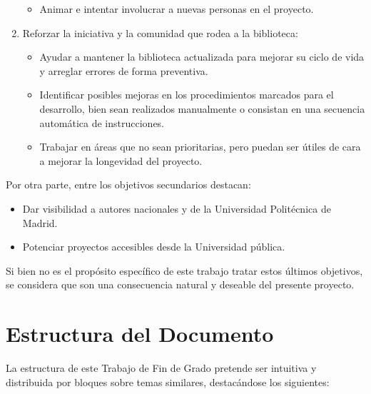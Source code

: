 \begin{enumerate}
\begin{itemize}
        \item Animar e intentar involucrar a nuevas personas en el proyecto.
    \end{itemize}

    \item Reforzar la iniciativa y la comunidad que rodea a la biblioteca:
    
    \begin{itemize}
        \item Ayudar a mantener la biblioteca actualizada para mejorar su ciclo de vida y arreglar errores de forma preventiva.
        
        \item Identificar posibles mejoras en los procedimientos marcados para el desarrollo, bien sean realizados manualmente o consistan en una secuencia automática de instrucciones.

        \item Trabajar en áreas que no sean prioritarias, pero puedan ser útiles de cara a mejorar la longevidad del proyecto.
    \end{itemize}

\end{enumerate}

Por otra parte, entre los objetivos secundarios destacan:

\begin{itemize}

    \item Dar visibilidad a autores nacionales y de la Universidad Politécnica de Madrid.

    \item Potenciar proyectos accesibles desde la Universidad pública.

\end{itemize}

Si bien no es el propósito específico de este trabajo tratar estos últimos objetivos, se considera que son una consecuencia natural y deseable del presente proyecto.


\section{Estructura del Documento} \label{sct:intro_estructura}

La estructura de este Trabajo de Fin de Grado pretende ser intuitiva y distribuida por bloques sobre temas similares, destacándose los siguientes:

